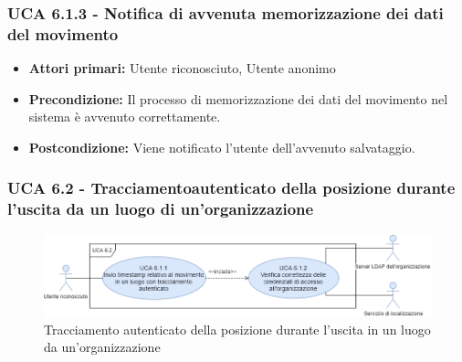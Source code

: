 \subsubsection{UCA 6.1.3 - Notifica di avvenuta memorizzazione dei dati del movimento}
\begin{itemize}
	\item \textbf{Attori primari:} Utente riconosciuto, Utente anonimo
	\item \textbf{Precondizione:} Il processo di memorizzazione dei dati del movimento nel sistema è avvenuto correttamente.
	\item \textbf{Postcondizione:} Viene notificato l'utente dell'avvenuto salvataggio.
\end{itemize}


\subsubsection{UCA 6.2 - Tracciamentoautenticato della posizione durante l'uscita da un luogo di un'organizzazione}

\begin{figure}[h]
	\centering
	\includegraphics[scale=0.4, center]{sezioni/UseCase/Immagini/UCA6.2.png}
	\caption{Tracciamento autenticato della posizione durante l'uscita in un luogo da un'organizzazione}
\end{figure} 

